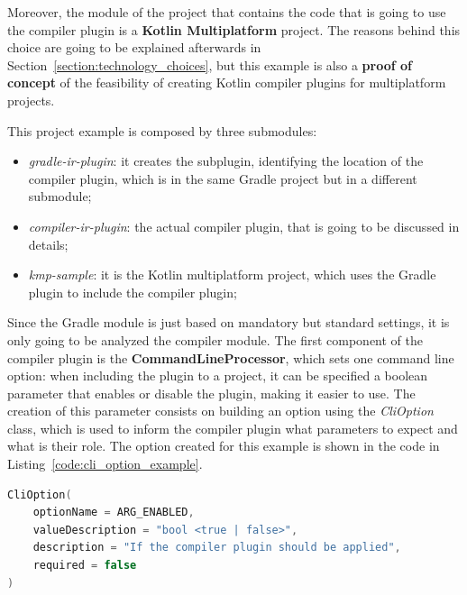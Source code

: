 Moreover, the module of the project that contains the code that is going to use the compiler plugin is a \textbf{Kotlin Multiplatform} project. The reasons behind this choice are going to be explained afterwards in Section~\ref{section:technology_choices}, but this example is also a \textbf{proof of concept} of the feasibility of creating Kotlin compiler plugins for multiplatform projects.

This project example is composed by three submodules:
\begin{itemize}
    \item \textit{gradle-ir-plugin}: it creates the subplugin, identifying the location of the compiler plugin, which is in the same Gradle project but in a different submodule;
    \item \textit{compiler-ir-plugin}: the actual compiler plugin, that is going to be discussed in details;
    \item \textit{kmp-sample}: it is the Kotlin multiplatform project, which uses the Gradle plugin to include the compiler plugin;
\end{itemize}

Since the Gradle module is just based on mandatory  but standard settings, it is only going to be analyzed the compiler module.\newline
The first component of the compiler plugin is the \textbf{CommandLineProcessor}, which sets one command line option: when including the plugin to a project, it can be specified a boolean parameter that enables or disable the plugin, making it easier to use.\newline
The creation of this parameter consists on building an option using the \textit{CliOption} class, which is used to inform the compiler plugin what parameters to expect and what is their role. The option created for this example is shown in the code in Listing~\ref{code:cli_option_example}.
\begin{lstlisting}[caption={Creation of compiler option that enables or disables the plugin}, captionpos=b, language=Kotlin, label={code:cli_option_example}]
CliOption(
    optionName = ARG_ENABLED,
    valueDescription = "bool <true | false>",
    description = "If the compiler plugin should be applied",
    required = false
)
\end{lstlisting}

